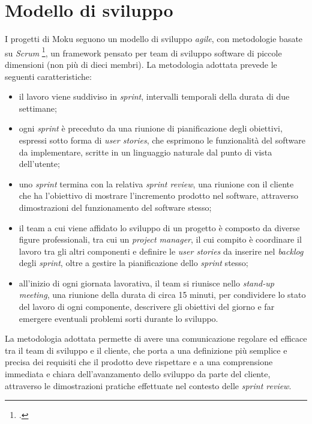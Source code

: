 \section{Modello di sviluppo}
I progetti di Moku seguono un modello di sviluppo \emph{agile}, con metodologie basate su \emph{Scrum} \footcite{site:scrum-guide}, un framework pensato per team di sviluppo software di piccole dimensioni (non più di dieci membri). La metodologia adottata prevede le seguenti caratteristiche:
\begin{itemize}
	\item il lavoro viene suddiviso in \emph{sprint}, intervalli temporali della durata di due settimane;
	\item ogni \emph{sprint} è preceduto da una riunione di pianificazione degli obiettivi, espressi sotto forma di \emph{user stories}, che esprimono le funzionalità del software da implementare, scritte in un linguaggio naturale dal punto di vista dell'utente;
	\item uno \emph{sprint} termina con la relativa \emph{sprint review}, una riunione con il cliente che ha l'obiettivo di mostrare l'incremento prodotto nel software, attraverso dimostrazioni del funzionamento del software stesso;
	\item il team a cui viene affidato lo sviluppo di un progetto è composto da diverse figure professionali, tra cui un \emph{project manager}, il cui compito è coordinare il lavoro tra gli altri componenti e definire le \emph{user stories} da inserire nel \emph{backlog} degli \emph{sprint}, oltre a gestire la pianificazione dello \emph{sprint} stesso;
	\item all'inizio di ogni giornata lavorativa, il team si riunisce nello \emph{stand-up meeting}, una riunione della durata di circa 15 minuti, per condividere lo stato del lavoro di ogni componente, descrivere gli obiettivi del giorno e far emergere eventuali problemi sorti durante lo sviluppo.
\end{itemize}
La metodologia adottata permette di avere una comunicazione regolare ed efficace tra il team di sviluppo e il cliente, che porta a una definizione più semplice e precisa dei requisiti che il prodotto deve rispettare e a una comprensione immediata e chiara dell'avanzamento dello sviluppo da parte del cliente, attraverso le dimostrazioni pratiche effettuate nel contesto delle \emph{sprint review}.
